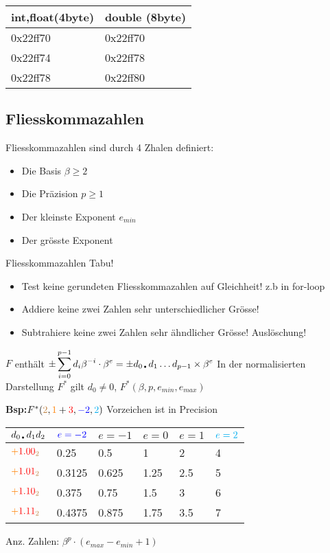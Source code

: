 \begin{center}
	\begin{tabular}{ ll } 
		\hline
int,float(4byte) & double (8byte)\\
\hline
0x22ff70 & 0x22ff70\\
0x22ff74 & 0x22ff78\\
0x22ff78 & 0x22ff80\\
		\hline
	\end{tabular}
\end{center}

\subsection{Fliesskommazahlen}
Fliesskommazahlen sind durch 4 Zhalen definiert:
\begin{itemize}
	\item Die Basis $\beta \geqslant 2$
	\item Die Präzision $p \geqslant 1$
	\item Der kleinste Exponent $e_{min}$
	\item Der grösste Exponent	
\end{itemize}
Fliesskommazahlen Tabu!
\begin{itemize}
	\item Test keine gerundeten Fliesskommazahlen auf Gleichheit! z.b in for-loop
	\item Addiere keine zwei Zahlen  sehr unterschiedlicher Grösse! 
	\item Subtrahiere keine zwei Zahlen sehr ähndlicher Grösse! Auslöschung!

\end{itemize}
$F$ enthält $\displaystyle \pm\sum_{i=0}^{p-1}d_i \beta^{-i}\cdot \beta^{e} =  \pm d_{0\text{\textbullet}} d_1\dots d_{p-1} \times \beta^e$
In der normalisierten Darstellung $F^{\ast}$ gilt $d_0 \neq 0$, $F^{\ast}(\beta,p,e_{min},e_{max})$ 

\textbf{Bsp:$F^{\ast}({\color{brown}{2}},{\color{orange}{1}}+{\color{red}{3}},{\color{blue}{-2}},{\color{cyan}{2}})$} Vorzeichen ist in Precision
\begin{center}
	\begin{tabular} { m{0.8cm} | m{0.8cm} m{0.95cm} m{0.7cm} m{0.7cm}m{0.6cm} }
	 $d_{0\text{\textbullet}} d_1 d_2$ & ${\color{blue}{e=-2}}$&$e=-1$&$e=0$&$e=1$&${\color{cyan}{e=2}}$\\
	 \hline
	 ${\color{orange}{+}}{\color{red}{1.00}}{\color{brown}{_2}}$ & 0.25   & 0.5   & 1    & 2   & 4\\
	 ${\color{orange}{+}}{\color{red}{1.01}}{\color{brown}{_2}}$ & 0.3125 & 0.625 & 1.25 & 2.5 & 5\\
	 ${\color{orange}{+}}{\color{red}{1.10}}{\color{brown}{_2}}$ & 0.375  & 0.75  & 1.5  & 3   & 6\\
	 ${\color{orange}{+}}{\color{red}{1.11}}{\color{brown}{_2}}$ & 0.4375 & 0.875 & 1.75 & 3.5 & 7\\
	 \hline
	\end{tabular}
\end{center}
Anz. Zahlen: $\beta^{p}\cdot (e_{max}-e_{min}+1) $

